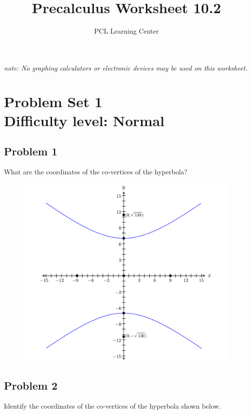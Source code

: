 \documentclass[12pt]{article}
\title{Precalculus Worksheet 10.2}
\author{PCL Learning Center}
\date{}
\begin{document}
\maketitle

\begin{center}
    \textit{note: No graphing calculators or electronic devices may be used on this worksheet.}    
\end{center}

\section*{Problem Set 1\\Difficulty level: Normal}
\subsection*{Problem 1}
What are the coordinates of the co-vertices of the hyperbola?
\begin{figure}[!ht]
    \centering
    \includegraphics[width=1\linewidth]{1.1.png}
\end{figure}

\newpage
\subsection*{Problem 2}
Identify the coordinates of the co-vertices of the hyperbola shown below.
\end{document}

